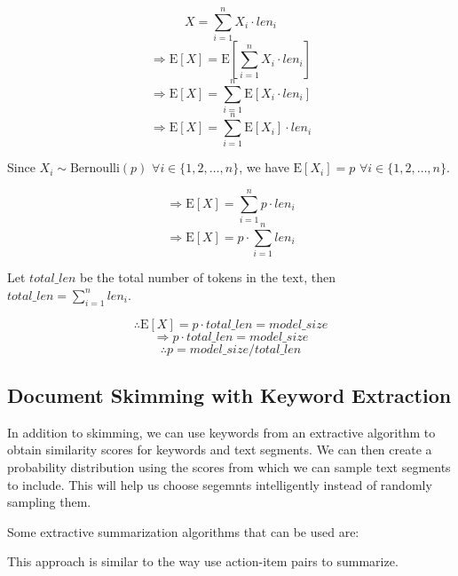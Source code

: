 \[ X = \sum_{i = 1}^{n} X_i \cdot len_i \]
\[ \Rightarrow \mathrm{E}[X] = \mathrm{E}[\sum_{i = 1}^{n} X_i \cdot len_i] \]
\[ \Rightarrow \mathrm{E}[X] = \sum_{i = 1}^{n} \mathrm{E}[X_i \cdot len_i] \]
\[ \Rightarrow \mathrm{E}[X] = \sum_{i = 1}^{n} \mathrm{E}[X_i] \cdot len_i \]

Since $X_i \sim \mathrm{Bernoulli}(p)$ $\forall i \in \{1, 2, \dots, n\}$, we
have $\mathrm{E}[X_i] = p$ $\forall i \in \{1, 2, \dots, n\}$.

\[ \Rightarrow \mathrm{E}[X] = \sum_{i = 1}^{n} p \cdot len_i \]
\[ \Rightarrow \mathrm{E}[X] = p \cdot \sum_{i = 1}^{n} len_i \]

Let $total\_len$ be the total number of tokens in the text, then
$total\_len = \sum_{i = 1}^{n} len_i$.

\[ \therefore \mathrm{E}[X] = p \cdot total\_len = model\_size \]
\[ \Rightarrow p \cdot total\_len = model\_size \]
\[ \therefore p = model\_size / total\_len \]


\subsection{Document Skimming with Keyword Extraction}

In addition to skimming, we can use keywords from an extractive algorithm to obtain
similarity scores for keywords and text segments.
We can then create a probability distribution using the scores from which we can sample
text segments to include.
This will help us choose segemnts intelligently instead of randomly sampling them.

Some extractive summarization algorithms that can be used are:

This approach is similar to the way \citet{golia2024action} use action-item
pairs to summarize.





